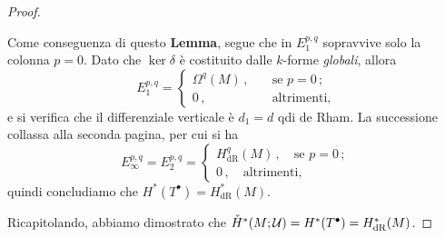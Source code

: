 \begin{ex!}
\begin{thm}
\begin{proof}
\begin{itemize}
				Come conseguenza di questo \textbf{Lemma}, 
				segue che in $E^{p,q}_{1}$
				sopravvive solo la colonna $p=0$.
				Dato che $\ker \delta$ è costituito dalle $k$-forme \emph{globali},
				allora 
				\begin{equation*}
				E_{1}^{p,q} 
				= \begin{cases}
					\Omega^{q}(M) \,, \quad &\text{se } p = 0\,; \\
					0\,, \quad &\text{altrimenti},
				\end{cases}
				\end{equation*}
				e si verifica che il differenziale verticale è $d_{1}=d$ qdi de Rham.
				La successione collassa alla seconda pagina, per cui si ha
				\begin{equation*}
					E_{\infty}^{p,q} = E_{2}^{p,q}
					= \begin{cases}
						H_{\mathrm{dR}}^{q}(M)\,, \quad \text{se } p=0\,; \\
						0\,, \quad \text{altrimenti},
					\end{cases}
				\end{equation*}
				quindi concludiamo che $H^{*}(T^{\bullet}) = H_{\mathrm{dR}}^{*}(M)$.
			\end{itemize}
			Ricapitolando, abbiamo dimostrato che 
			$\check{H}^{*}(M;\mathcal{U}) = H^{*}(T^{\bullet}) = H_{\mathrm{dR}}^{*}(M)$.
		\end{proof}
	\end{thm}
\end{ex!}




